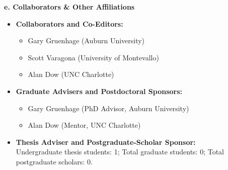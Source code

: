 \noindent\textbf{e. \medskip Collaborators \& Other Affiliations}

\begin{itemize}

    \item \textbf{Collaborators and Co-Editors:}\\
        \begin{itemize}
          \item Gary Gruenhage (Auburn University)
          \item Scott Varagona (University of Montevallo)
          \item Alan Dow (UNC Charlotte)
        \end{itemize}

    \item \textbf{Graduate Advisers and Postdoctoral Sponsors:}\\
        \begin{itemize}
          \item Gary Gruenhage (PhD Advisor, Auburn University)
          \item Alan Dow (Mentor, UNC Charlotte)
        \end{itemize}


    \item \textbf{Thesis Adviser and Postgraduate-Scholar Sponsor:}\\
        Undergraduate thesis students: 1;
        Total graduate students: 0; Total postgraduate scholars: 0.


\end{itemize}
